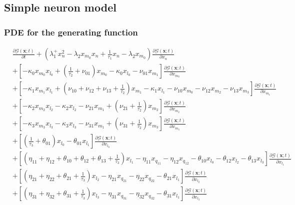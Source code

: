 \documentclass[a4paper, 11pt]{article}
\begin{document}
\subsection{Simple neuron model}
\subsubsection{PDE for the generating function}
\begin{equation*}
  \begin{split}
    & \frac{\partial\mathcal G(\mathbf x; t)}{\partial t} + \left(\lambda^+_1x_n^2-\lambda_2x_{m_0}x_n + \frac{1}{\tau_1}x_n - \lambda_2x_{m_0}\right)\frac{\partial\mathcal G(\mathbf x; t)}{\partial x_n}\\
    &+\left[-\kappa_0x_{m_0}x_{l_0} + \left(\frac{1}{\tau_2}+\nu_{01}\right)x_{m_0} - \kappa_0x_{l_0} - \nu_{01}x_{m_1}\right]\frac{\partial \mathcal G(\mathbf x; t)}{\partial x_{m_0}}\\
    &+\left[- \kappa_1x_{m_1}x_{l_1} +\left(\nu_{10}+\nu_{12}+\nu_{13}+\frac{1}{\tau_2}\right)x_{m_1} - \kappa_1x_{l_1} - \nu_{10}x_{m_0}  - \nu_{12}x_{m_2} - \nu_{13}x_{m_3}\right]\frac{\partial\mathcal G(\mathbf x; t)}{\partial x_{m_1}}\\
    &+\left[-\kappa_2x_{m_2}x_{l_2} - \kappa_2x_{l_2} - \nu_{21}x_{m_1} + \left(\nu_{21} + \frac{1}{\tau_2}\right)x_{m_2}\right]\frac{\partial\mathcal G(\mathbf x; t)}{\partial x_{m_2}}\\
    &+\left[-\kappa_3x_{m_3}x_{l_3} - \kappa_3x_{l_3} - \nu_{31}x_{m_1} + \left(\nu_{31} + \frac{1}{\tau_2}\right)x_{m_3}\right]\frac{\partial\mathcal G(\mathbf x; t)}{\partial x_{m_3}}\\
    &+\left[\left(\frac{1}{\tau_3}+\theta_{01}\right)x_{l_0} - \theta_{01}x_{l_1}\right]\frac{\partial\mathcal G(\mathbf x; t)}{\partial x_{l_0}}\\ %
    &+\left[\left(\eta_{11}+\eta_{12}+\theta_{10}+\theta_{12}+\theta_{13}+\frac{1}{\tau_3}\right)x_{l_1} - \eta_{11}x_{q_{11}} - \eta_{12}x_{q_{12}} - \theta_{10}x_{l_0} - \theta_{12}x_{l_2} - \theta_{13}x_{l_3}\right]\frac{\partial\mathcal G(\mathbf x; t)}{\partial x_{l_1}}\\
    &+\left[\left(\eta_{21}+\eta_{22}+\theta_{21}+\frac{1}{\tau_3}\right)x_{l_2} - \eta_{21}x_{q_{21}} - \eta_{22}x_{q_{22}} - \theta_{21}x_{l_1}\right]\frac{\partial\mathcal G(\mathbf x;t)}{\partial x_{l_2}}\\ 
    &+\left[\left(\eta_{31}+\eta_{32}+\theta_{31}+\frac{1}{\tau_3}\right)x_{l_3} - \eta_{31}x_{q_{31}} - \eta_{32}x_{q_{32}} - \theta_{31}x_{l_1} \right]\frac{\partial\mathcal G(\mathbf x;t)}{\partial x_{l_3}}\\ 

\end{split}
\end{equation*}
\end{document}
